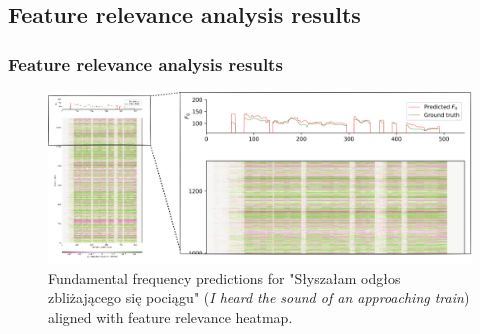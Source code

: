 \documentclass[a4paper,9pt]{beamer}
\theoremstyle{mytheoremstyle}
\begin{document}
\subsection{Feature relevance analysis results}

\begin{frame}
\frametitle{Feature relevance analysis results}
\begin{figure}
\begin{center}
  \includegraphics[width=\textwidth]{res/amu_pl_ilo_baza_2006a_zbitki_a0036_zoom}
\end{center}
	\caption{Fundamental frequency predictions for "S\l{}ysza\l{}am odg\l{}os zbli\.zaj\k{a}cego si\k{e} poci\k{a}gu" (\textit{I heard the sound of an approaching train}) aligned with feature relevance heatmap.}
\end{figure}
\end{frame}
\end{document}
